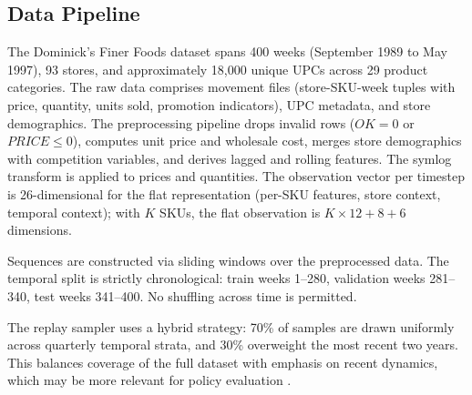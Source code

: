 \subsection{Data Pipeline}

The Dominick's Finer Foods dataset \citep{dominicks1999} spans 400 weeks (September 1989 to May 1997), 93 stores, and approximately 18,000 unique UPCs across 29 product categories. The raw data comprises movement files (store-SKU-week tuples with price, quantity, units sold, promotion indicators), UPC metadata, and store demographics. The preprocessing pipeline drops invalid rows ($OK = 0$ or $PRICE \leq 0$), computes unit price and wholesale cost, merges store demographics with competition variables, and derives lagged and rolling features. The symlog transform is applied to prices and quantities. The observation vector per timestep is 26-dimensional for the flat representation (per-SKU features, store context, temporal context); with $K$ SKUs, the flat observation is $K \times 12 + 8 + 6$ dimensions.

Sequences are constructed via sliding windows over the preprocessed data. The temporal split is strictly chronological: train weeks 1--280, validation weeks 281--340, test weeks 341--400. No shuffling across time is permitted.

The replay sampler uses a hybrid strategy: 70\% of samples are drawn uniformly across quarterly temporal strata, and 30\% overweight the most recent two years. This balances coverage of the full dataset with emphasis on recent dynamics, which may be more relevant for policy evaluation \citep{agarwal2021deep}.
